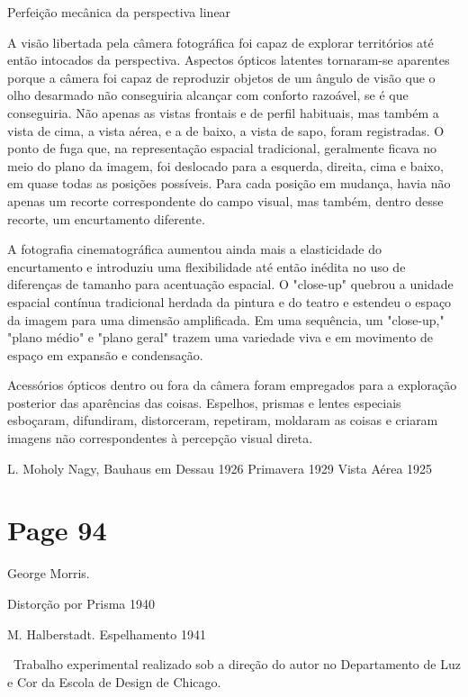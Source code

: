 \documentclass[a4paper]{article}
\begin{document}
Perfeição mecânica da perspectiva linear

A visão libertada pela câmera fotográfica foi capaz de explorar territórios até então intocados da perspectiva. Aspectos ópticos latentes tornaram-se aparentes porque a câmera foi capaz de reproduzir objetos de um ângulo de visão que o olho desarmado não conseguiria alcançar com conforto razoável, se é que conseguiria. Não apenas as vistas frontais e de perfil habituais, mas também a vista de cima, a vista aérea, e a de baixo, a vista de sapo, foram registradas. O ponto de fuga que, na representação espacial tradicional, geralmente ficava no meio do plano da imagem, foi deslocado para a esquerda, direita, cima e baixo, em quase todas as posições possíveis. Para cada posição em mudança, havia não apenas um recorte correspondente do campo visual, mas também, dentro desse recorte, um encurtamento diferente.

A fotografia cinematográfica aumentou ainda mais a elasticidade do encurtamento e introduziu uma flexibilidade até então inédita no uso de diferenças de tamanho para acentuação espacial. O "close-up" quebrou a unidade espacial contínua tradicional herdada da pintura e do teatro e estendeu o espaço da imagem para uma dimensão amplificada. Em uma sequência, um "close-up," "plano médio" e "plano geral" trazem uma variedade viva e em movimento de espaço em expansão e condensação.

Acessórios ópticos dentro ou fora da câmera foram empregados para a exploração posterior das aparências das coisas. Espelhos, prismas e lentes especiais esboçaram, difundiram, distorceram, repetiram, moldaram as coisas e criaram imagens não correspondentes à percepção visual direta.

L. Moholy Nagy,
Bauhaus em Dessau 1926
Primavera 1929
Vista Aérea 1925


\newpage
\section*{Page 94}

George Morris.\par
Distorção por Prisma 1940 \textbullet

\bigskip %

M. Halberstadt. Espelhamento 1941 \textbullet\par
\textbullet\ Trabalho experimental realizado sob a direção do autor no Departamento de Luz e Cor da Escola de Design de Chicago.
\end{document}
